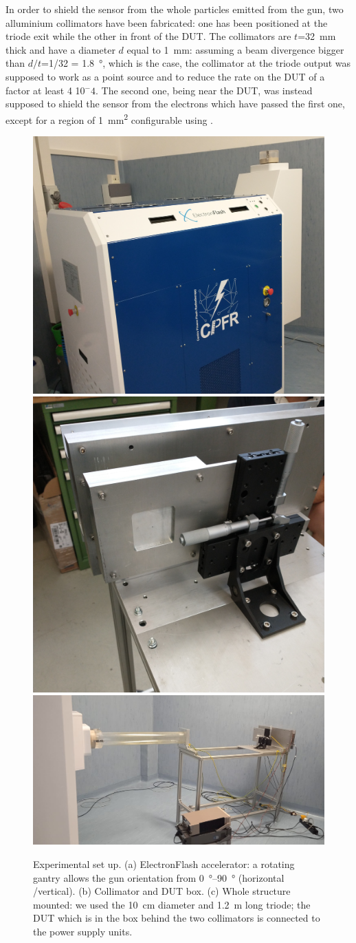       In order to shield the sensor from the whole particles emitted from the gun, two alluminium collimators have been fabricated: one has been positioned at the triode exit while the other in front of the DUT. The collimators are $t$=\SI{32}{mm} thick and have a diameter $d$ equal to \SI{1}{mm}: assuming a beam divergence bigger than $d/t$=1/32 = \SI{1.8}{\degree}, which is the case, the collimator at the triode output was supposed to work as a point source and to reduce the rate on the DUT of a factor at least 4 10${^-4}$. The second one, being near the DUT, was instead supposed to shield the sensor from the electrons which have passed the first one, except for a region of \SI{1}{mm\squared} configurable using .  
      \begin{figure}[h!]
         \centering
         \includegraphics[width=.40\linewidth]{figures/test_beam/electron_flash.jpg}
         \includegraphics[width=.35\linewidth]{figures/test_beam/collimator_box.jpg}\\     
         \includegraphics[width=.77\linewidth]{figures/test_beam/carrello.jpeg} 
         \label{fig:set_up}
         \caption{Experimental set up. (a) ElectronFlash accelerator: a
         rotating gantry allows the gun orientation from \SIrange{0}{90}{\degree} (horizontal /vertical). (b) Collimator and DUT box. (c) Whole structure mounted: we used the \SI{10}{cm} diameter and \SI{1.2}{m} long triode; the DUT which is in the box behind the two collimators is connected to the power supply units.}
      \end{figure}  

